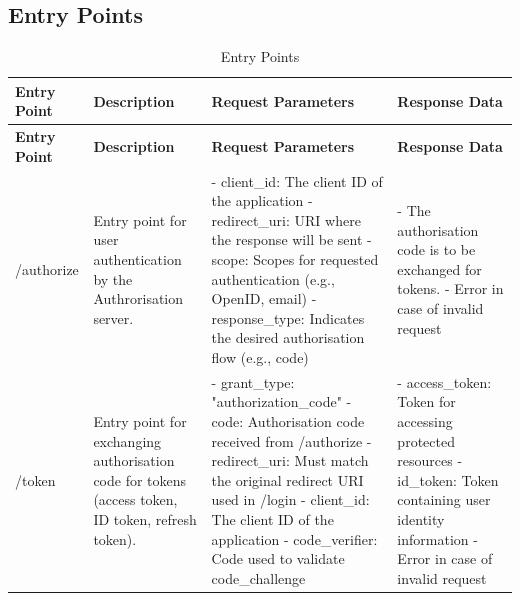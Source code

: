 \subsection{Entry Points}
\begin{longtable}{|p{3cm}|p{4cm}|p{4cm}|p{4cm}|}
\caption{Entry Points}
\label{table:threat_model_entry_points}
\hline
\rowcolor{grey!15}
\textbf{Entry Point} & \textbf{Description} & \textbf{Request Parameters} & \textbf{Response Data} \\
\hline
\endfirsthead
\hline
\rowcolor{grey!15}
\textbf{Entry Point} & \textbf{Description} & \textbf{Request Parameters} & \textbf{Response Data} \\
\hline
\endhead
\endfoot
\hline
\endlastfoot

/authorize & Entry point for user authentication by the Authrorisation server.  & 
- client\_id: The client ID of the application \newline 
- redirect\_uri: URI where the response will be sent \newline
- scope: Scopes for requested authentication (e.g., OpenID, email) \newline 
- response\_type: Indicates the desired authorisation flow (e.g., code) \citep{openid_docs} & 
- The authorisation code is to be exchanged for tokens. \newline 
- Error in case of invalid request \\
\hline

/token & Entry point for exchanging authorisation code for tokens (access token, ID token, refresh token). & 
- grant\_type: "authorization\_code" \newline 
- code: Authorisation code received from /authorize \newline
- redirect\_uri: Must match the original redirect URI used in /login \newline 
- client\_id: The client ID of the application
- code\_verifier: Code used to validate code\_challenge \citep{openid_docs}& 
- access\_token: Token for accessing protected resources \newline 
- id\_token: Token containing user identity information \newline 
- Error in case of invalid request \\
\hline

\end{longtable}

